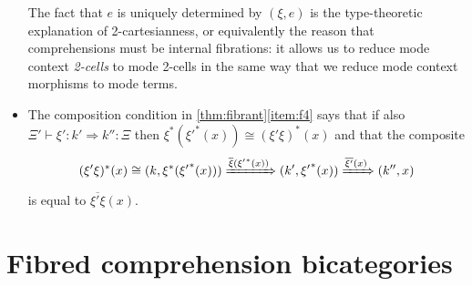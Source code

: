 \documentclass{amsart}
\let\To\Rightarrow
\let\xTo\xRightarrow
\def\ar#1{\mathscr{M}\!\mathit{or}_{#1}}
\let\types\vdash
\begin{document}
\begin{itemize}
  The fact that $e$ is uniquely determined by $(\xi,e)$ is the type-theoretic explanation of 2-cartesianness, or equivalently the reason that comprehensions must be internal fibrations: it allows us to reduce mode context \emph{2-cells} to mode 2-cells in the same way that we reduce mode context morphisms to mode terms.
\item The composition condition in \cref{thm:fibrant}\ref{item:f4} says that if also $\Xi' \types \xi' : k'\To k'' : \Xi$ then $\xi^*({\xi'}^*(x)) \cong (\xi'\xi)^*(x)$ and that the composite
  \[ (\xi'\xi)^*(x) \cong (k,\xi^*({\xi'}^*(x))) \xTo{\xibar({\xi'}^*(x))} (k',{\xi'}^*(x)) \xTo{\overline{\xi'}(x)} (k'',x) \]
  is equal to $\overline{\xi'\xi}(x)$.
\end{itemize}


\section{Fibred comprehension bicategories}
\label{sec:fib-comp-bicat}

\end{document}
